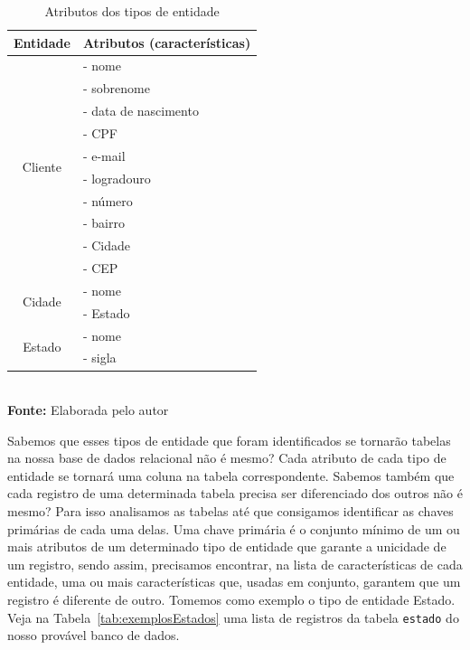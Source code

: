 \FloatBarrier
\begin{table}[ht]
    \centering
    \caption{Atributos dos tipos de entidade}
	\begin{tabular}{cl}
	    \hline
	        \textbf{Entidade}     & \textbf{Atributos (características)} \\ \hline
	    \multirow{10}{*}{Cliente} & - nome                               \\
	                              & - sobrenome                          \\
	                              & - data de nascimento                 \\
	                              & - CPF                                \\
	                              & - e-mail                             \\
	                              & - logradouro                         \\ 
	                              & - número                             \\
	                              & - bairro                             \\
	                              & - Cidade                             \\
	                              & - CEP                                \\ \hline
	     \multirow{2}{*}{Cidade}  & - nome                               \\
	                              & - Estado                             \\ \hline
	     \multirow{2}{*}{Estado}  & - nome                               \\
	                              & - sigla                              \\ \hline
	\end{tabular}
    \\ \vspace{0.2cm}
    \textbf{Fonte:} Elaborada pelo autor
    \label{tab:caracteristicasEntidades}
\end{table}
\FloatBarrier

Sabemos que esses tipos de entidade que foram identificados se tornarão tabelas na nossa base de dados relacional não é mesmo? Cada atributo de cada tipo de entidade se tornará uma coluna na tabela correspondente. Sabemos também que cada registro de uma determinada tabela precisa ser diferenciado dos outros não é mesmo? Para isso analisamos as tabelas até que consigamos identificar as chaves primárias de cada uma delas. Uma chave primária é o conjunto mínimo de um ou mais atributos de um determinado tipo de entidade que garante a unicidade de um registro, sendo assim, precisamos encontrar, na lista de características de cada entidade, uma ou mais características que, usadas em conjunto, garantem que um registro é diferente de outro. Tomemos como exemplo o tipo de entidade Estado. Veja na Tabela~\ref{tab:exemplosEstados} uma lista de registros da tabela \texttt{estado} do nosso provável banco de dados.

